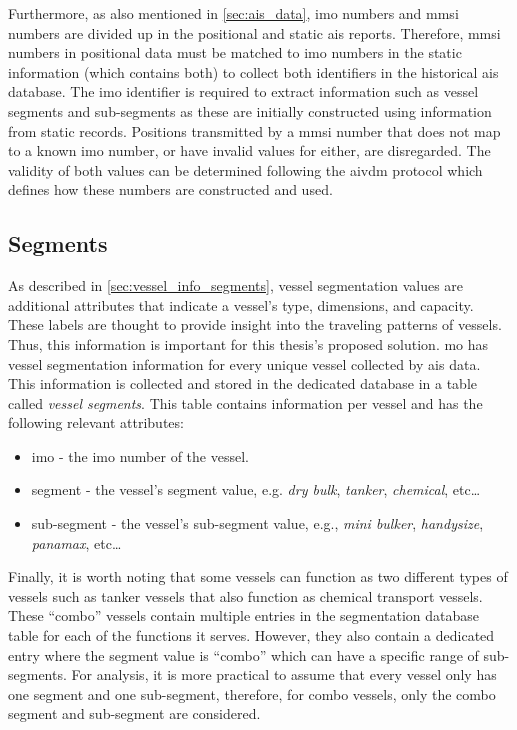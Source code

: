 Furthermore, as also mentioned in \cref{sec:ais_data}, \acrshort{imo} numbers and \acrshort{mmsi} numbers are divided up in the positional and static \acrshort{ais} reports. Therefore, \acrshort{mmsi} numbers in positional data must be matched to \acrshort{imo} numbers in the static information (which contains both) to collect both identifiers in the historical \acrshort{ais} database. The \acrshort{imo} identifier is required to extract information such as vessel segments and sub-segments as these are initially constructed using information from static records. Positions transmitted by a \acrshort{mmsi} number that does not map to a known \acrshort{imo} number, or have invalid values for either, are disregarded. The validity of both values can be determined following the \gls{aivdm} protocol which defines how these numbers are constructed and used.

\subsection{Segments}

As described in \cref{sec:vessel_info_segments}, vessel segmentation values are additional attributes that indicate a vessel's type, dimensions, and capacity. These labels are thought to provide insight into the traveling patterns of vessels. Thus, this information is important for this thesis's proposed solution. \acrshort{mo} has vessel segmentation information for every unique vessel collected by \acrshort{ais} data. This information is collected and stored in the dedicated database in a table called \textit{vessel segments}. This table contains information per vessel and has the following relevant attributes:

\begin{itemize}
    \item imo - the \acrshort{imo} number of the vessel.
    \item segment - the vessel's segment value, e.g. \textit{dry bulk}, \textit{tanker}, \textit{chemical}, etc\ldots
    \item sub-segment - the vessel's sub-segment value, e.g., \textit{mini bulker}, \textit{handysize}, \textit{panamax}, etc\ldots
\end{itemize}

Finally, it is worth noting that some vessels can function as two different types of vessels such as tanker vessels that also function as chemical transport vessels. These ``combo'' vessels contain multiple entries in the segmentation database table for each of the functions it serves. However, they also contain a dedicated entry where the segment value is ``combo'' which can have a specific range of sub-segments. For analysis, it is more practical to assume that every vessel only has one segment and one sub-segment, therefore, for combo vessels, only the combo segment and sub-segment are considered.

